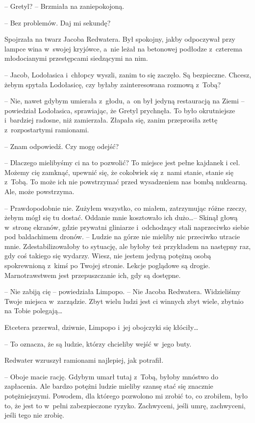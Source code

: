 \documentclass[oneside,polish,11pt,sfheadings]{mwbk}
\begin{document}
-- Gretyl? -- Brzmiała na zaniepokojoną.

-- Bez problemów. Daj mi sekundę?

Spojrzała na twarz Jacoba Redwatera. Był spokojny, jakby odpoczywał przy
lampce wina w~swojej kryjówce, a~nie leżał na betonowej podłodze z~czterema młodocianymi przestępcami siedzącymi na nim. 

-- Jacob,
Lodołasica i~chłopcy wyszli, zanim to się zaczęło. Są bezpieczne.
Chcesz, żebym spytała Lodołasicę, czy byłaby zainteresowana rozmową z~Tobą?

-- Nie, nawet gdybym umierała z~głodu, a~on był jedyną restauracją na
Ziemi -- powiedział Lodołasica, sprawiając, że Gretyl prychnęła. To było
okrutniejsze i~bardziej radosne, niż zamierzała. Złapała się, zanim
przeprosiła zettę z~rozpostartymi ramionami.

-- Znam odpowiedź. Czy mogę odejść?

-- Dlaczego mielibyśmy ci na to pozwolić? To miejsce jest pełne kajdanek
i cel. Możemy cię zamknąć, upewnić się, że cokolwiek się z~nami stanie,
stanie się z~Tobą. To może ich nie powstrzymać przed wysadzeniem nas
bombą nuklearną. Ale, może powstrzyma.

-- Prawdopodobnie nie. Zużyłem wszystko, co miałem, zatrzymując różne
rzeczy, żebym mógł się tu dostać. Oddanie mnie kosztowało ich dużo\ldots  -- Skinął głową w~stronę ekranów, gdzie prywatni gliniarze i~odchodzący
stali naprzeciwko siebie pod baldachimem dronów. -- Ludzie na górze nie
mieliby nic przeciwko utracie mnie. Zdestabilizowałoby to sytuację, ale
byłoby też przykładem na następny raz, gdy coś takiego się wydarzy.
Wiesz, nie jestem jedyną potężną osobą spokrewnioną z~kimś po Twojej
stronie. Lekcje poglądowe są drogie. Marnotrawstwem jest przepuszczanie
ich, gdy są dostępne.

-- Nie zabiją cię -- powiedziała Limpopo. -- Nie Jacoba Redwatera.
Widzieliśmy Twoje miejsca w~zarządzie. Zbyt wielu ludzi jest ci winnych
zbyt wiele, zbytnio na Tobie polegają\ldots 

Etcetera przerwał, dziwnie, Limpopo i~jej obojczyki się kłóciły\ldots  

-- To
oznacza, że są ludzie, którzy chcieliby wejść w~jego buty.

Redwater wzruszył ramionami najlepiej, jak potrafił. 

-- Oboje macie
rację. Gdybym umarł tutaj z~Tobą, byłoby mnóstwo do zapłacenia. Ale
bardzo potężni ludzie mieliby szansę stać się znacznie potężniejszymi.
Powodem, dla którego pozwolono mi zrobić to, co zrobiłem, było to, że
jest to w~pełni zabezpieczone ryzyko. Zachwyceni, jeśli umrę,
zachwyceni, jeśli tego nie zrobię.
\end{document}
